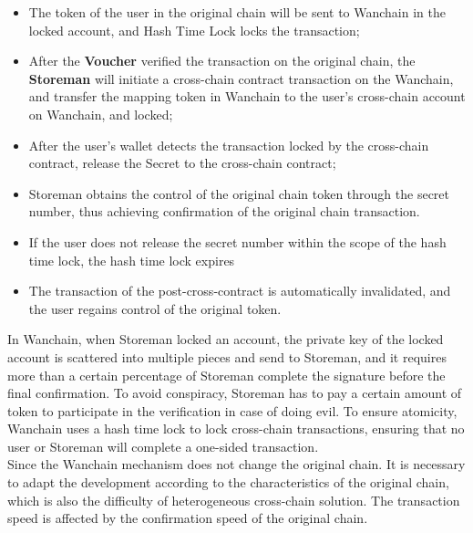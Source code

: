 \begin{itemize}

    \item The token of the user in the original chain will be sent to Wanchain in the locked account, and Hash Time Lock locks the transaction;
    \item After the \textbf{Voucher} verified  the transaction on the original chain, the \textbf{Storeman} will initiate a cross-chain contract transaction on the Wanchain, and transfer the mapping token in Wanchain to the user's cross-chain account on Wanchain, and locked;
    \item After the user's wallet detects the transaction locked by the cross-chain contract, release the Secret to the cross-chain contract;
    \item Storeman obtains the control of the original chain token through the secret number, thus achieving confirmation of the original chain transaction.
    \item If the user does not release the secret number within the scope of the hash time lock, the hash time lock expires
    \item The transaction of the post-cross-contract is automatically invalidated, and the user regains control of the original token.
\end{itemize}
\noindent In Wanchain, when Storeman locked an account, the private key of the locked account is scattered into multiple pieces and send to Storeman, and it requires more than a certain percentage of Storeman complete the signature before the final confirmation. To avoid conspiracy, Storeman has to pay a certain amount of token to participate in the verification in case of doing evil. To ensure atomicity, Wanchain uses a hash time lock to lock cross-chain transactions, ensuring that no user or Storeman will complete a one-sided transaction.\\
\noindent Since the Wanchain mechanism does not change the original chain. It is necessary to adapt the development according to the characteristics of the original chain, which is also the difficulty of heterogeneous cross-chain solution. The transaction speed is affected by the confirmation speed of the original chain.\\